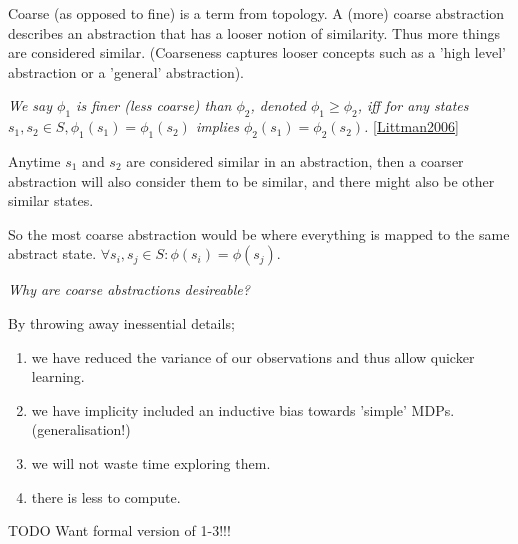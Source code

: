 Coarse (as opposed to fine) is a term from topology.
A (more) coarse abstraction describes an abstraction that has a looser notion of similarity.
Thus more things are considered similar.
(Coarseness captures looser concepts such as a 'high level' abstraction or a 'general' abstraction).

\textit{We say $\phi_1$ is finer (less coarse) than $\phi_2$, denoted $\phi_1 \ge \phi_2$,
iff for any states $s_1, s_2 \in S, \phi_1(s_1) = \phi_1(s_2)$ implies $\phi_2(s_1) = \phi_2(s_2)$.} \ref{Littman2006}

Anytime $s_1$ and $s_2$ are considered similar in an abstraction, then a coarser
abstraction will also consider them to be similar, and there might also be other similar states.

So the most coarse abstraction would be where everything is mapped to the same abstract state.
$\forall s_i, s_j\in S: \phi(s_i)=\phi(s_j)$.


\begin{displayquote}
\textit{Why are coarse abstractions desireable?}
\end{displayquote}

By throwing away inessential details;
\begin{enumerate}
  \tightlist
  \item we have reduced the variance of our observations and thus allow quicker learning.
  \item we have implicity included an inductive bias towards 'simple' MDPs. (generalisation!)
  \item we will not waste time exploring them.
  \item there is less to compute.
\end{enumerate}



{\color{red}TODO Want formal version of 1-3!!!}


